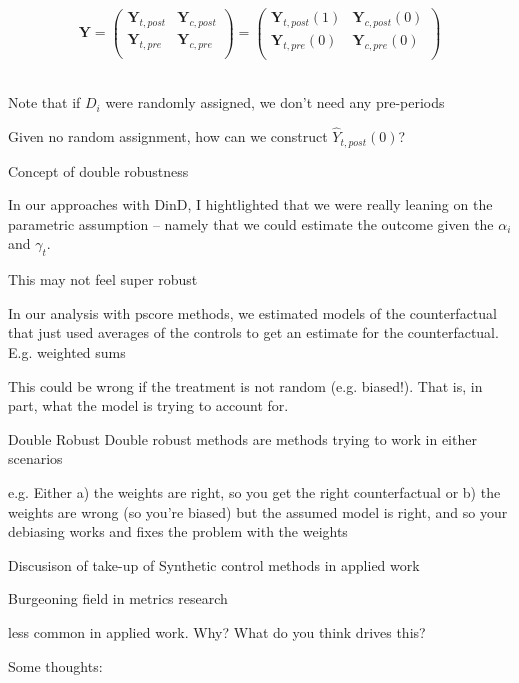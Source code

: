 \documentclass[notes,11pt, aspectratio=169]{beamer}
\newenvironment{wideitemize}{\itemize\addtolength{\itemsep}{10pt}}{\enditemize}
\begin{document}
\begin{frame}
        \begin{equation*}
        \mathbf{Y} = \left( \begin{array}{cc}
                              \mathbf{Y}_{t,post} & \mathbf{Y}_{c,post} \\
                              \mathbf{Y}_{t,pre} & \mathbf{Y}_{c,pre} \\
                            \end{array}
                            \right) =  \left( \begin{array}{cc}
                              \mathbf{Y}_{t,post}(1) & \mathbf{Y}_{c,post}(0) \\
                              \mathbf{Y}_{t,pre}(0) & \mathbf{Y}_{c,pre}(0) \\
                            \end{array}
                            \right) 
      \end{equation*}
      \begin{wideitemize}
        \
      \item Note that if $D_{i}$ were randomly assigned, we don't need any pre-periods
      \item Given no random assignment, how can we construct $\hat{Y}_{t,post}(0)$?
      \end{wideitemize}

\end{frame}

\begin{frame}
  Concept of double robustness

  In our approaches with DinD, I hightlighted that we were really
  leaning on the parametric assumption -- namely that we could
  estimate the outcome given the $\alpha_{i}$ and $\gamma_{t}$.

  This may not feel super robust

  In our analysis with pscore methods, we estimated models of the
  counterfactual that just used averages of the controls to get an
  estimate for the counterfactual. E.g. weighted sums

  This could be wrong if the treatment is not random
  (e.g. biased!). That is, in part, what the model is trying to
  account for.
\end{frame}

\begin{frame}{Double Robust}
  Double robust methods are methods trying to work in either scenarios

  e.g. Either a) the weights are right, so you get the right
  counterfactual or b) the weights are wrong (so you're biased) but
  the assumed model is right, and so your debiasing works and fixes
  the problem with the weights

\end{frame}


\begin{frame}
  Discusison of take-up of Synthetic control methods in applied work

  Burgeoning field in metrics research

  less common in applied work. Why? What do you think drives this?

  Some thoughts:
\end{frame}
\end{document}
